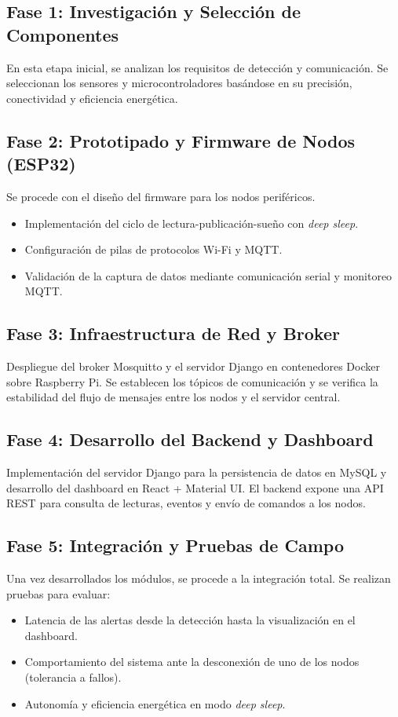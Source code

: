 \documentclass[11pt,a4paper]{article}
\begin{document}
\subsection{Fase 1: Investigación y Selección de Componentes}
En esta etapa inicial, se analizan los requisitos de detección y comunicación. Se seleccionan los sensores y microcontroladores basándose en su precisión, conectividad y eficiencia energética.

\subsection{Fase 2: Prototipado y Firmware de Nodos (ESP32)}
Se procede con el diseño del firmware para los nodos periféricos. 
\begin{itemize}
    \item Implementación del ciclo de lectura-publicación-sueño con \textit{deep sleep}.
    \item Configuración de pilas de protocolos Wi-Fi y MQTT.
    \item Validación de la captura de datos mediante comunicación serial y monitoreo MQTT.
\end{itemize}

\subsection{Fase 3: Infraestructura de Red y Broker}
Despliegue del broker Mosquitto y el servidor Django en contenedores Docker sobre Raspberry Pi. Se establecen los tópicos de comunicación y se verifica la estabilidad del flujo de mensajes entre los nodos y el servidor central.

\subsection{Fase 4: Desarrollo del Backend y Dashboard}
Implementación del servidor Django para la persistencia de datos en MySQL y desarrollo del dashboard en React + Material UI. El backend expone una API REST para consulta de lecturas, eventos y envío de comandos a los nodos.

\subsection{Fase 5: Integración y Pruebas de Campo}
Una vez desarrollados los módulos, se procede a la integración total. Se realizan pruebas para evaluar:
\begin{itemize}
    \item Latencia de las alertas desde la detección hasta la visualización en el dashboard.
    \item Comportamiento del sistema ante la desconexión de uno de los nodos (tolerancia a fallos).
    \item Autonomía y eficiencia energética en modo \textit{deep sleep}.
\end{itemize}
\end{document}
